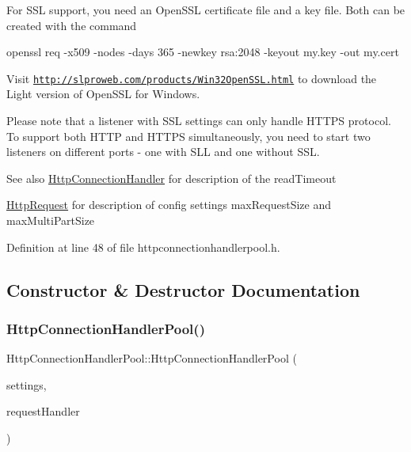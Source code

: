 For S\+SL support, you need an Open\+S\+SL certificate file and a key file. Both can be created with the command {\ttfamily 
\begin{DoxyPre}
    openssl req -x509 -nodes -days 365 -newkey rsa:2048 -keyout my.key -out my.cert
\end{DoxyPre}
} 

Visit \href{http://slproweb.com/products/Win32OpenSSL.html}{\tt http\+://slproweb.\+com/products/\+Win32\+Open\+S\+S\+L.\+html} to download the Light version of Open\+S\+SL for Windows. 

Please note that a listener with S\+SL settings can only handle H\+T\+T\+PS protocol. To support both H\+T\+TP and H\+T\+T\+PS simultaneously, you need to start two listeners on different ports -\/ one with S\+LL and one without S\+SL. \begin{DoxySeeAlso}{See also}
\mbox{\hyperlink{classstefanfrings_1_1_http_connection_handler}{Http\+Connection\+Handler}} for description of the read\+Timeout 

\mbox{\hyperlink{classstefanfrings_1_1_http_request}{Http\+Request}} for description of config settings max\+Request\+Size and max\+Multi\+Part\+Size 
\end{DoxySeeAlso}


Definition at line 48 of file httpconnectionhandlerpool.\+h.



\subsection{Constructor \& Destructor Documentation}
\mbox{\label{classstefanfrings_1_1_http_connection_handler_pool_a0e0873de42ccc13bf08eaa3b845c8592}} 
\subsubsection{\texorpdfstring{Http\+Connection\+Handler\+Pool()}{HttpConnectionHandlerPool()}}
{\footnotesize\ttfamily Http\+Connection\+Handler\+Pool\+::\+Http\+Connection\+Handler\+Pool (\begin{DoxyParamCaption}\item[{Q\+Settings $\ast$}]{settings,  }\item[{\mbox{\hyperlink{classstefanfrings_1_1_http_request_handler}{Http\+Request\+Handler}} $\ast$}]{request\+Handler }\end{DoxyParamCaption})}

